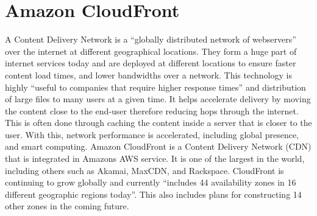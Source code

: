 \section{Amazon CloudFront}
A Content Delivery Network is a “globally distributed network of webservers” \cite{hid-sp18-512-amazon-cloudfront-b} over the internet at different geographical locations. They form a huge part of internet services today and are deployed at different locations to ensure faster content load times, and lower bandwidths over a network. This technology is highly “useful to companies that require higher response times”\cite{hid-sp18-512-amazon-cloudfront-b} and distribution of large files to many users at a given time. It helps accelerate delivery by moving the content close to the end-user therefore reducing hops through the internet. This is often done through caching the content inside a server that is closer to the user. With this, network performance is accelerated, including global presence, and smart computing. Amazon CloudFront is a Content Delivery Network (CDN) that is integrated in Amazons AWS service. It is one of the largest in the world, including others such as Akamai, MaxCDN, and Rackspace. CloudFront is continuing to grow globally and currently “includes 44 availability zones in 16 different geographic regions today”\cite{hid-sp18-512-amazon-cloudfront-a}. This also includes plans for constructing 14 other zones in the coming future.
